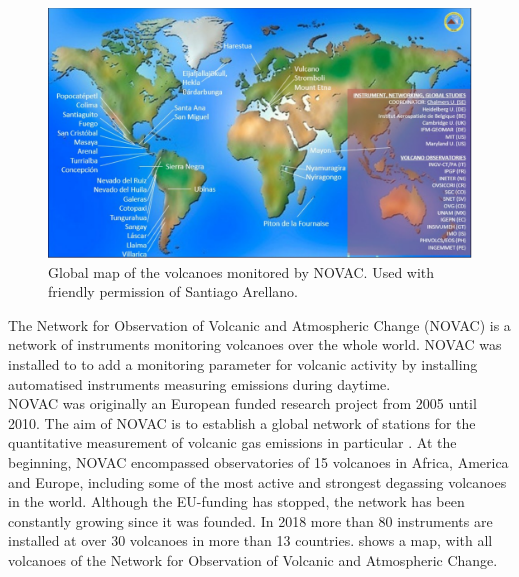 


		\begin{figure}[h]
			\centering
			\includegraphics[width=0.8\linewidth]{Bilder/NOVAC2015}
			\caption{Global map of the volcanoes monitored by NOVAC. Used with friendly permission of Santiago Arellano.}
			\label{fig:novac2015}
		\end{figure}
		The Network for Observation of Volcanic and Atmospheric Change (NOVAC) is a network of instruments monitoring volcanoes over the whole world. 
		NOVAC was installed to to add a monitoring parameter for volcanic activity by installing automatised instruments measuring  emissions during daytime.\\
		NOVAC was originally an European funded research project from 2005 until 2010. The aim of NOVAC is to  establish  a  global  
		network  of  stations  for  the  quantitative  measurement  of  volcanic gas  emissions in particular . At the beginning, NOVAC encompassed observatories of 15 volcanoes in Africa, America and Europe, including some of the most active and strongest degassing volcanoes in the world. Although the EU-funding has stopped, the network has been constantly growing since it was founded. In 2018 more than 80 instruments are installed at over 30 volcanoes in more than 13 countries.
		 shows a map, with all volcanoes of the Network for Observation of Volcanic and Atmospheric Change.\\
		
